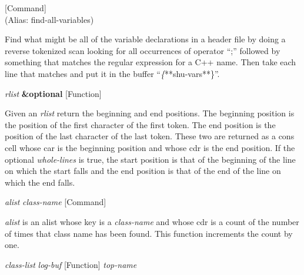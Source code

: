 \vspace{1em}
\noindent
{}
\usebox{\funcname}
 \hfill [Command]\\%
 (Alias: find-all-variables)

\begin{doc-string}
Find what might be all of the variable declarations in a header file by doing
a reverse tokenized scan looking for all occurrences of operator ``;'' followed
by something that matches the regular expression for a C++ name.  Then take each
line that matches and put it in the buffer ``\emph\{**shu-vars**\}''.
\end{doc-string}

\vspace{1em}
\noindent
{}
\usebox{\funcname}\emph{rlist} \textbf{\&optional}
 \hfill [Function]
\hspace*{\wd\funcname}

\begin{doc-string}
Given an \emph{rlist} return the beginning and end positions.  The beginning position is
the position of the first character of the first token.  The end position is the
position of the last character of the last token.  These two are returned as a cons
cell whose car is the beginning position and whose cdr is the end position.  If
the optional \emph{whole-lines} is true, the start position is that of the beginning of
the line on which the start falls and the end position is that of the end of
the line on which the end falls.
\end{doc-string}

\vspace{1em}
\noindent
{}
\usebox{\funcname}\emph{alist} \emph{class-name}
 \hfill [Command]

\begin{doc-string}
\emph{alist} is an alist whose key is a \emph{class-name} and whose cdr is a count of the
number of times that class name has been found.  This function increments the
count by one.
\end{doc-string}

\vspace{1em}
\noindent
{}
\usebox{\funcname}\emph{class-list} \emph{log-buf}
 \hfill [Function]
\hspace*{\wd\funcname}\emph{top-name}

